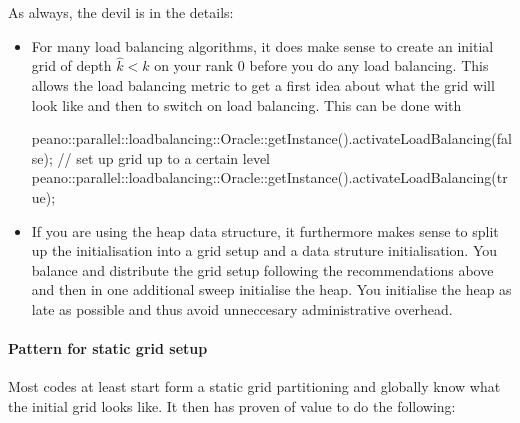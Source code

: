 As always, the devil is in the details:
\begin{itemize}
  \item  For many load balancing algorithms, it does make sense to create an
  initial grid of depth $\hat k <k$ on your rank 0 before you do any load
  balancing. This allows the load balancing metric to get a first idea about
  what the grid will look like and then to switch on load
  balancing. This can be done with
  \begin{code}
  peano::parallel::loadbalancing::Oracle::getInstance().activateLoadBalancing(false);
  // set up grid up to a certain level
  peano::parallel::loadbalancing::Oracle::getInstance().activateLoadBalancing(true);
  \end{code}









  \item If you are using the heap data structure, it furthermore makes sense to split up
the initialisation into a grid setup and a data struture initialisation.
You balance and distribute the grid setup following the recommendations above
and then in one additional sweep initialise the heap.
You initialise the heap as late as possible and thus avoid unneccesary
administrative overhead.
\end{itemize}


\paragraph{Pattern for static grid setup}

Most codes at least start form a static grid partitioning and globally know
what the initial grid looks like.
It then has proven of value to do the following:

